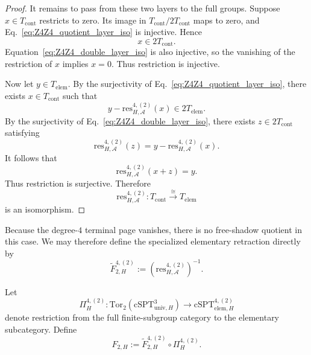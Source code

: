 \documentclass[aps,prx,reprint,superscriptaddress,twocolumn,amsmath,amssymb,amsfonts, nofootinbib]{revtex4-2}
\newcommand{\res}{\text{res}}
\newcommand{\tor}{\text{Tor}}
\theoremstyle{apsstyle}
\begin{document}
\begin{proof}
It remains to pass from these two layers to the full groups. Suppose
$x\in T_{\mathrm{cont}}$ restricts to zero. Its image in
$T_{\mathrm{cont}}/2T_{\mathrm{cont}}$ maps to zero, and
Eq.~\eqref{eq:Z4Z4_quotient_layer_iso} is injective. Hence
\begin{equation*}
x\in 2T_{\mathrm{cont}}.
\end{equation*}
Equation~\eqref{eq:Z4Z4_double_layer_iso} is also injective, so the
vanishing of the restriction of $x$ implies $x=0$. Thus restriction
is injective.

Now let $y\in T_{\mathrm{elem}}$. By the surjectivity of
Eq.~\eqref{eq:Z4Z4_quotient_layer_iso}, there exists
$x\in T_{\mathrm{cont}}$ such that
\begin{equation*}
y-\res_{H,\mathcal A}^{4,(2)}(x)
\in
2T_{\mathrm{elem}}.
\end{equation*}
By the surjectivity of Eq.~\eqref{eq:Z4Z4_double_layer_iso}, there
exists $z\in 2T_{\mathrm{cont}}$ satisfying
\begin{equation*}
\res_{H,\mathcal A}^{4,(2)}(z)
=
y-\res_{H,\mathcal A}^{4,(2)}(x).
\end{equation*}
It follows that
\begin{equation*}
\res_{H,\mathcal A}^{4,(2)}(x+z)=y.
\end{equation*}
Thus restriction is surjective. Therefore
\begin{equation*}
\res_{H,\mathcal A}^{4,(2)}:
T_{\mathrm{cont}}
\xrightarrow{\cong}
T_{\mathrm{elem}}
\end{equation*}
is an isomorphism.
\end{proof}

\bigskip

Because the degree-$4$ terminal page vanishes, there is no
free-shadow quotient in this case. We may therefore define the
specialized elementary retraction directly by
\begin{equation}
\widetilde F_{2,H}^{4,(2)}
:=
\left(
\res_{H,\mathcal A}^{4,(2)}
\right)^{-1}.
\label{eq:Z4Z4_specialized_retraction}
\end{equation}

\noindent Let
\begin{equation}
\Pi_H^{4,(2)}:
\tor_2\left(
\mathrm{cSPT}_{\mathrm{univ},H}^{3}
\right)
\longrightarrow
\mathrm{cSPT}_{\mathrm{elem},H}^{4,(2)}
\label{eq:Z4Z4_specialized_projection}
\end{equation}
denote restriction from the full finite-subgroup category to the
elementary subcategory. Define
\begin{equation}
F_{2,H}
:=
\widetilde F_{2,H}^{4,(2)}
\circ
\Pi_H^{4,(2)}.
\label{eq:Z4Z4_specialized_F2}
\end{equation}
\end{document}
